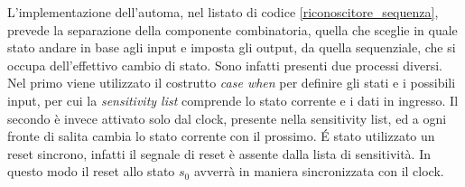  L'implementazione dell'automa, nel listato di codice \ref{riconoscitore_sequenza}, prevede la separazione della componente combinatoria, quella che sceglie in quale stato andare in base agli input e imposta gli output, da quella sequenziale, che si occupa dell'effettivo cambio di stato. 
 Sono infatti presenti due processi diversi. Nel primo viene utilizzato il costrutto \textit{case when} per definire gli stati e i possibili input, per cui la \textit{sensitivity list} comprende lo stato corrente e i dati in ingresso. Il secondo è invece attivato solo dal clock, presente nella sensitivity list, ed a ogni fronte di salita cambia lo stato corrente con il prossimo. É stato utilizzato un reset sincrono, infatti il segnale di reset è assente dalla lista di sensitività. In questo modo il reset allo stato \textit{$s_0$} avverrà in maniera sincronizzata con il clock.
